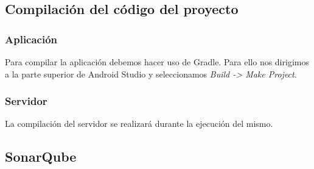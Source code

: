 \subsection{Compilación del código del proyecto}

\subsubsection{Aplicación}

Para compilar la aplicación debemos hacer uso de Gradle. Para ello nos dirigimos a la parte superior de Android Studio y seleccionamos \textit{Build -> Make Project}.

\subsubsection{Servidor}

La compilación del servidor se realizará durante la ejecución del mismo.

\subsection{SonarQube} \label{sonaruse}

